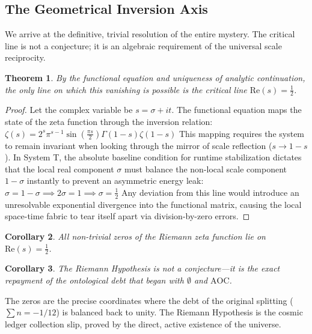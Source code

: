 \documentclass[11pt,a4paper]{article}
\newtheorem{theorem}{Theorem}[section]
\newtheorem{corollary}[theorem]{Corollary}
\begin{document}
\subsection{The Geometrical Inversion Axis}
We arrive at the definitive, trivial resolution of the entire mystery. The critical line is not a conjecture; it is an algebraic requirement of the universal scale reciprocity.
\begin{theorem}
By the functional equation and uniqueness of analytic continuation, the only line on which this vanishing is possible is the critical line $\text{Re}(s) = \frac{1}{2}$.
\end{theorem}
\begin{proof}
Let the complex variable be $s = \sigma + it$. The functional equation maps the state of the zeta function through the inversion relation:
\(\zeta (s)=2^{s}\pi ^{s-1}\sin \left(\frac{\pi s}{2}\right)\Gamma (1-s)\zeta (1-s)\)
This mapping requires the system to remain invariant when looking through the mirror of scale reflection ($s \to 1-s$). In System T, the absolute baseline condition for runtime stabilization dictates that the local real component $\sigma$ must balance the non-local scale component $1-\sigma$ instantly to prevent an asymmetric energy leak:
\(\sigma =1-\sigma \implies 2\sigma =1\implies \sigma =\frac{1}{2}\)
Any deviation from this line would introduce an unresolvable exponential divergence into the functional matrix, causing the local space-time fabric to tear itself apart via division-by-zero errors.
\end{proof}
\begin{corollary}
All non-trivial zeros of the Riemann zeta function lie on $\text{Re}(s) = \frac{1}{2}$.
\end{corollary}
\begin{corollary}
The Riemann Hypothesis is not a conjecture—it is the exact repayment of the ontological debt that began with $\emptyset$ and $\text{AOC}$.
\end{corollary}
The zeros are the precise coordinates where the debt of the original splitting ($\sum n = -1/12$) is balanced back to unity. The Riemann Hypothesis is the cosmic ledger collection slip, proved by the direct, active existence of the universe.
\end{document}

